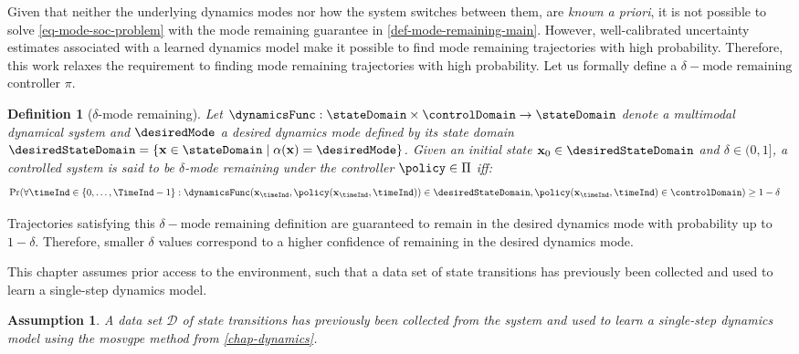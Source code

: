\documentclass{mimosis-class/mimosis}
\newtheorem{definition}{Definition}[section]
\newtheorem{assumption}{Assumption}[section]
\numberwithin{equation}{chapter}
\newcommand{\state}{\ensuremath{\mathbf{x}}}
\newcommand{\control}{\ensuremath{\mathbf{u}}}
\newcommand{\dataset}{\ensuremath{\mathcal{D}}}
\newcommand{\modeVar}{\ensuremath{\alpha}}
\begin{document}
{Given that neither the underlying dynamics modes nor how the system switches between them, are \emph{known a priori},
it is not possible to solve \cref{eq-mode-soc-problem} with the mode remaining guarantee in \cref{def-mode-remaining-main}.
However, well-calibrated uncertainty estimates associated with a learned dynamics model make it possible to
find mode remaining trajectories with high probability.
Therefore, this work relaxes the requirement to finding mode remaining trajectories with high probability.
Let us formally define a \(\delta-\text{mode remaining}\) controller \(\pi\).
\begin{definition}[$\delta$-mode remaining] \label{def-delta-mode-remaining}
Let $\dynamicsFunc : \stateDomain \times \controlDomain \rightarrow \stateDomain$ denote a multimodal dynamical system
and $\desiredMode$ a desired dynamics mode defined by its state domain $\desiredStateDomain = \{ \state \in \stateDomain \mid \modeVar(\state) = \desiredMode \}$.
Given an initial state $\state_0 \in \desiredStateDomain$ and $\delta \in (0,1]$,
a controlled system is said to be $\delta$-mode remaining under the controller $\policy \in \Pi$ iff:
\begin{align} \label{eq-mode-remaining-def-explore}
\Pr( \forall \timeInd \in \{0,\ldots,\TimeInd-1\} : \dynamicsFunc(\state_{\timeInd}, \policy(\state_{\timeInd}, \timeInd))
&\in \desiredStateDomain,
\policy(\state_{\timeInd}, \timeInd) \in \controlDomain) \geq 1 - \delta
\end{align}
\end{definition}

Trajectories satisfying this \(\delta-\text{mode remaining}\) definition
are guaranteed to remain in the desired dynamics mode with probability
up to \(1-\delta\). Therefore, smaller \(\delta\) values correspond to a higher confidence of remaining in the desired
dynamics mode.

This chapter assumes prior access to the environment, such that a data set of state transitions has previously
been collected and used to learn a single-step dynamics model.
\begin{assumption} \label{}
A data set $\dataset$ of state transitions has previously been collected from the system and used to learn
a single-step dynamics model using the \acrshort{mosvgpe} method from \cref{chap-dynamics}.
\end{assumption}


}
\end{document}
